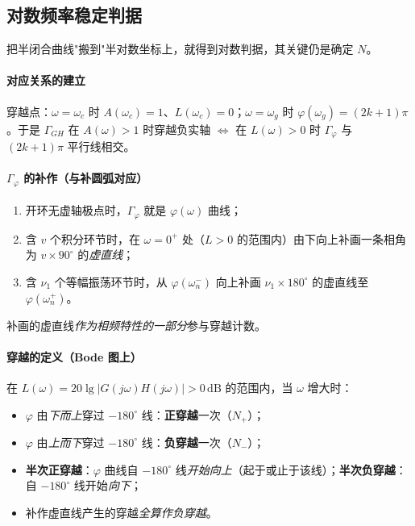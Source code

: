 \subsection{对数频率稳定判据}
把半闭合曲线"搬到"半对数坐标上，就得到对数判据，其关键仍是确定 $N$。

\paragraph{对应关系的建立}
穿越点：$\omega=\omega_c$ 时 $A(\omega_c)=1$、$L(\omega_c)=0$；$\omega=\omega_g$ 时 $\varphi(\omega_g)=(2k+1)\pi$。于是 $\Gamma_{GH}$ 在 $A(\omega)>1$ 时穿越负实轴 $\Longleftrightarrow$ 在 $L(\omega)>0$ 时 $\Gamma_\varphi$ 与 $(2k+1)\pi$ 平行线相交。

\paragraph{$\Gamma_\varphi$ 的补作（与补圆弧对应）}
\begin{enumerate}
    \item 开环无虚轴极点时，$\Gamma_\varphi$ 就是 $\varphi(\omega)$ 曲线；
    \item 含 $v$ 个积分环节时，在 $\omega=0^+$ 处（$L>0$ 的范围内）由下向上补画一条相角为 $v\times90^\circ$ 的\emph{虚直线}；
    \item 含 $\nu_1$ 个等幅振荡环节时，从 $\varphi(\omega_n^-)$ 向上补画 $\nu_1\times180^\circ$ 的虚直线至 $\varphi(\omega_n^+)$。
\end{enumerate}
补画的虚直线\emph{作为相频特性的一部分}参与穿越计数。

\paragraph{穿越的定义（Bode 图上）}
在 $L(\omega)=20\lg|G(j\omega)H(j\omega)|>0\,\mathrm{dB}$ 的范围内，当 $\omega$ 增大时：
\begin{itemize}
    \item $\varphi$ 由\emph{下而上}穿过 $-180^\circ$ 线：\textbf{正穿越}一次（$N_+$）；
    \item $\varphi$ 由\emph{上而下}穿过 $-180^\circ$ 线：\textbf{负穿越}一次（$N_-$）；
    \item \textbf{半次正穿越}：$\varphi$ 曲线自 $-180^\circ$ 线\emph{开始向上}（起于或止于该线）；\textbf{半次负穿越}：自 $-180^\circ$ 线开始\emph{向下}；
    \item 补作虚直线产生的穿越\emph{全算作负穿越}。
\end{itemize}

